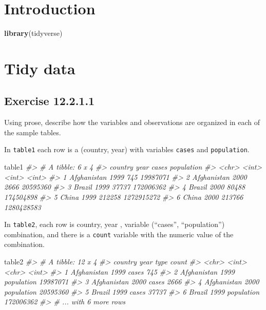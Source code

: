 \documentclass[]{book}
\newenvironment{Shaded}{\begin{snugshade}}{\end{snugshade}}
\newcommand{\CommentTok}[1]{\textcolor[rgb]{0.56,0.35,0.01}{\textit{#1}}}
\newcommand{\KeywordTok}[1]{\textcolor[rgb]{0.13,0.29,0.53}{\textbf{#1}}}
\newcommand{\NormalTok}[1]{#1}
\theoremstyle{plain}
\theoremstyle{remark}
\begin{document}
\hypertarget{introduction-7}{%
\section{Introduction}\label{introduction-7}}

\begin{Shaded}
\begin{Highlighting}[]
\KeywordTok{library}\NormalTok{(tidyverse)}
\end{Highlighting}
\end{Shaded}

\hypertarget{tidy-data-1}{%
\section{Tidy data}\label{tidy-data-1}}

\hypertarget{exercise-12.2.1.1}{%
\subsection*{\texorpdfstring{Exercise
{12.2.1.1}}{Exercise 12.2.1.1}}\label{exercise-12.2.1.1}}

Using prose, describe how the variables and observations are organized
in each of the sample tables.

In \texttt{table1} each row is a (country, year) with variables
\texttt{cases} and \texttt{population}.

\begin{Shaded}
\begin{Highlighting}[]
\NormalTok{table1}
\CommentTok{#> # A tibble: 6 x 4}
\CommentTok{#>   country      year  cases population}
\CommentTok{#>   <chr>       <int>  <int>      <int>}
\CommentTok{#> 1 Afghanistan  1999    745   19987071}
\CommentTok{#> 2 Afghanistan  2000   2666   20595360}
\CommentTok{#> 3 Brazil       1999  37737  172006362}
\CommentTok{#> 4 Brazil       2000  80488  174504898}
\CommentTok{#> 5 China        1999 212258 1272915272}
\CommentTok{#> 6 China        2000 213766 1280428583}
\end{Highlighting}
\end{Shaded}

In \texttt{table2}, each row is country, year , variable (``cases'',
``population'') combination, and there is a \texttt{count} variable with
the numeric value of the combination.

\begin{Shaded}
\begin{Highlighting}[]
\NormalTok{table2}
\CommentTok{#> # A tibble: 12 x 4}
\CommentTok{#>   country      year type           count}
\CommentTok{#>   <chr>       <int> <chr>          <int>}
\CommentTok{#> 1 Afghanistan  1999 cases            745}
\CommentTok{#> 2 Afghanistan  1999 population  19987071}
\CommentTok{#> 3 Afghanistan  2000 cases           2666}
\CommentTok{#> 4 Afghanistan  2000 population  20595360}
\CommentTok{#> 5 Brazil       1999 cases          37737}
\CommentTok{#> 6 Brazil       1999 population 172006362}
\CommentTok{#> # ... with 6 more rows}
\end{Highlighting}
\end{Shaded}
\end{document}
